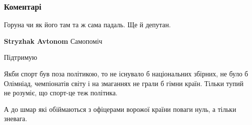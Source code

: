  
 
 
 
 
\subsubsection{Коментарі}
\label{sec:09_08_2021.fb.valianos_anton.1.podruga_znimaj_pogony.cmt}

\begin{itemize}
 
Горуна чи як його там та ж сама падаль. Ще й депутан.

\begin{itemize}
 
\textbf{Stryzhak Avtonom} Самопоміч
\end{itemize}

 
Підтримую

 

Якби спорт був поза політикою, то не існувало б національних збірних, не було б
Олімніад, чемпіонатів світу і на змаганнях не грали б гімни країн. Тільки тупий
не розуміє, що спорт-це теж політика.

А до шмар які обіймаються з офіцерами ворожої країни поваги нуль, а тільки
зневага.


\end{itemize}
